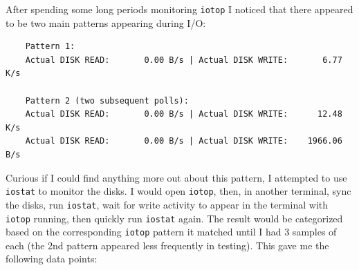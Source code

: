 \documentclass{article}
\begin{document}
After spending some long periods monitoring \texttt{iotop} I noticed that there appeared to be two main patterns appearing during I/O:
\begin{verbatim}
	Pattern 1:
	Actual DISK READ:       0.00 B/s | Actual DISK WRITE:       6.77 K/s

	Pattern 2 (two subsequent polls):
	Actual DISK READ:       0.00 B/s | Actual DISK WRITE:      12.48 K/s
	Actual DISK READ:       0.00 B/s | Actual DISK WRITE:    1966.06 B/s
\end{verbatim}
Curious if I could find anything more out about this pattern, I attempted to use \texttt{iostat} to monitor the disks.  I would open \texttt{iotop}, then, in another terminal, sync the disks, run \texttt{iostat}, wait for write activity to appear in the terminal with \texttt{iotop} running, then quickly run \texttt{iostat} again.  The result would be categorized based on the corresponding \texttt{iotop} pattern it matched until I had 3 samples of each (the 2nd pattern appeared less frequently in testing).  This gave me the following data points:
\end{document}
